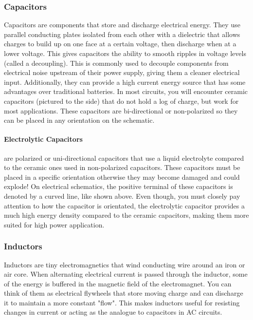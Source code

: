         \subsubsection*{Capacitors}
        Capacitors are components that store and discharge electrical energy.
        They use parallel conducting plates isolated from each other with a dielectric that allows charges to build up on one face at a certain voltage, then discharge when at a lower voltage.
        This gives capacitors the ability to smooth ripples in voltage levels (called a decoupling).
        This is commonly used to decouple components from electrical noise upstream of their power supply, giving them a cleaner electrical input.
        Additionally, they can provide a high current energy source that has some advantages over traditional batteries.
        In most circuits, you will encounter ceramic capacitors (pictured to the side) that do not hold a log of charge, but work for most applications.
        These capacitors are bi-directional or non-polarized so they can be placed in any orientation on the schematic.


        \paragraph*{Electrolytic Capacitors} are polarized or uni-directional capacitors that use a liquid electrolyte compared to the ceramic ones used in non-polarized capacitors.
        These capacitors must be placed in a specific orientation otherwise they may become damaged and could explode!
        On electrical schematics, the positive terminal of these capacitors is denoted by a curved line, like shown above.
        Even though, you must closely pay attention to how the capacitor is orientated, the electrolytic capacitor provides a much high energy density compared to the ceramic capacitors, making them more suited for high power application.


        \subsubsection*{Inductors}
        Inductors are tiny electromagnetics that wind conducting wire around an iron or air core.
        When alternating electrical current is passed through the inductor, some of the energy is buffered in the magnetic field of the electromagnet. 
        You can think of them as electrical flywheels that store moving charge and can discharge it to maintain a more constant "flow".
        This makes inductors useful for resisting changes in current or acting as the analogue to capacitors in AC circuits.

